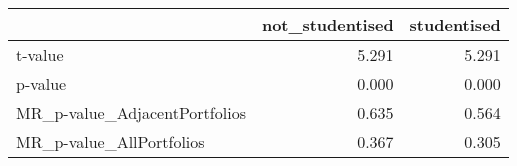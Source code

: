 
\begin{tabular}{lrr}
\toprule
  & not\_studentised & studentised\\
\midrule
t-value & 5.291 & 5.291\\
p-value & 0.000 & 0.000\\
MR\_p-value\_AdjacentPortfolios & 0.635 & 0.564\\
MR\_p-value\_AllPortfolios & 0.367 & 0.305\\
\bottomrule
\end{tabular}
